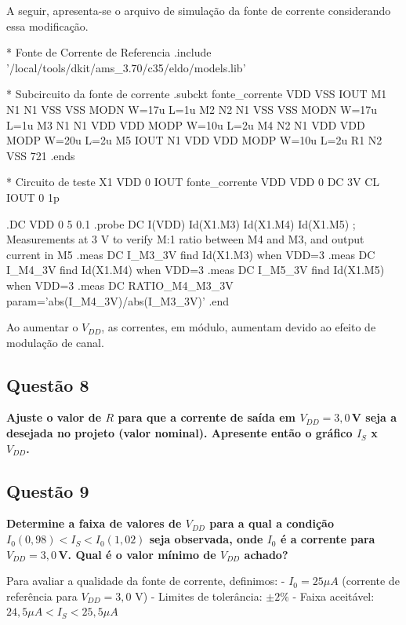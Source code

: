 ﻿\documentclass[12pt,a4paper]{article}
\begin{document}
A seguir, apresenta-se o arquivo de simulação da fonte de corrente considerando essa modificação.

\begin{codeblock}[title={Arquivo de simulação da fonte de corrente}]
* Fonte de Corrente de Referencia
.include '/local/tools/dkit/ams_3.70/c35/eldo/models.lib'

* Subcircuito da fonte de corrente
.subckt fonte_corrente VDD VSS IOUT
M1 N1 N1 VSS VSS MODN W=17u L=1u
M2 N2 N1 VSS VSS MODN W=17u L=1u
M3 N1 N1 VDD VDD MODP W=10u L=2u
M4 N2 N1 VDD VDD MODP W=20u L=2u
M5 IOUT N1 VDD VDD MODP W=10u L=2u
R1 N2 VSS 721
.ends

* Circuito de teste
X1 VDD 0 IOUT fonte_corrente
VDD VDD 0 DC 3V
CL IOUT 0 1p

.DC VDD 0 5 0.1
.probe DC I(VDD) Id(X1.M3) Id(X1.M4) Id(X1.M5)
; Measurements at 3 V to verify M:1 ratio between M4 and M3, and output current in M5
.meas DC I_M3_3V find Id(X1.M3) when VDD=3
.meas DC I_M4_3V find Id(X1.M4) when VDD=3
.meas DC I_M5_3V find Id(X1.M5) when VDD=3
.meas DC RATIO_M4_M3_3V param='abs(I_M4_3V)/abs(I_M3_3V)'
.end
\end{codeblock}

Ao aumentar o $V_{DD}$, as correntes, em módulo, aumentam devido ao efeito de modulação de canal.

\subsection*{Questão 8}
\begin{BoxQ}
	\textbf{Ajuste o valor de $R$ para que a corrente de saída em $V_{DD} = 3{,}0$\,V seja a desejada no projeto (valor nominal). Apresente então o gráfico $I_{S}$ x $V_{DD}$.}
\end{BoxQ}


\subsection*{Questão 9}
\begin{BoxQ}
	\textbf{Determine a faixa de valores de $V_{DD}$ para a qual a condição $I_0(0{,}98) < I_S < I_0(1{,}02)$ seja observada, onde $I_0$ é a corrente para $V_{DD} = 3{,}0$\,V. Qual é o valor mínimo de $V_{DD}$ achado?}
\end{BoxQ}



Para avaliar a qualidade da fonte de corrente, definimos:
- $I_0 = 25 \mu A$ (corrente de referência para $V_{DD} = 3,0$ V)
- Limites de tolerância: $\pm 2\%$
- Faixa aceitável: $24,5 \mu A < I_S < 25,5 \mu A$
\end{document}
